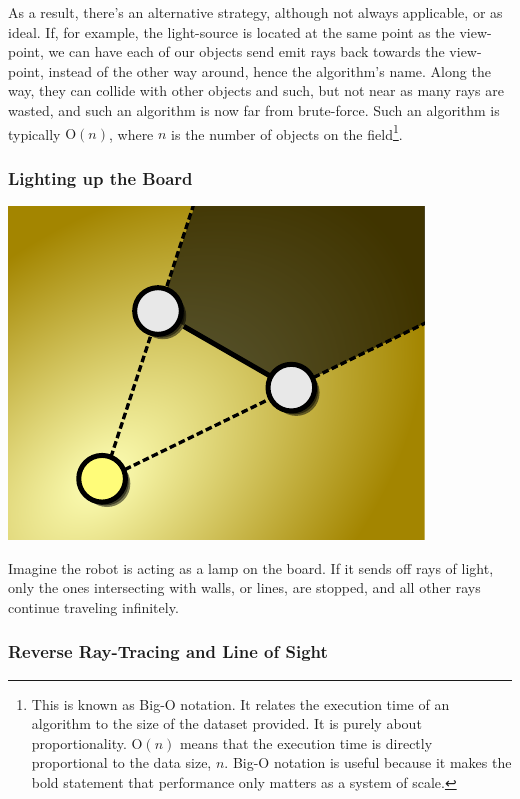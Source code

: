 \documentclass[letterpaper, 12pt]{article}
\begin{document}
\begin{multicols}{2}
As a result, there's an alternative strategy, although not always applicable, or
as ideal. If, for example, the light-source is located at the same point as the
view-point, we can have each of our objects send emit rays back towards the
view-point, instead of the other way around, hence the algorithm's name. Along
the way, they can collide with other objects and such, but not near as many rays
are wasted, and such an algorithm is now far from brute-force.
\cite{wikiraytrace} Such an algorithm is typically \(\mathrm{O}(n)\), where
\(n\) is the number of objects on the field\footnote{This is known as Big-O
notation. It relates the execution time of an algorithm to the size of the
dataset provided. It is purely about proportionality. \(\mathrm{O}(n)\) means
that the execution time is directly proportional to the data size, \(n\). Big-O
notation is useful because it makes the bold statement that performance only
matters as a system of scale.}.

\subsubsection{Lighting up the Board}

\includegraphics[width=\columnwidth]{img/light.pdf}

Imagine the robot is acting as a lamp on the board. If it sends off rays of
light, only the ones intersecting with walls, or lines, are stopped, and all
other rays continue traveling infinitely.

\subsubsection{Reverse Ray-Tracing and Line of Sight}


\end{multicols}
\end{document}
